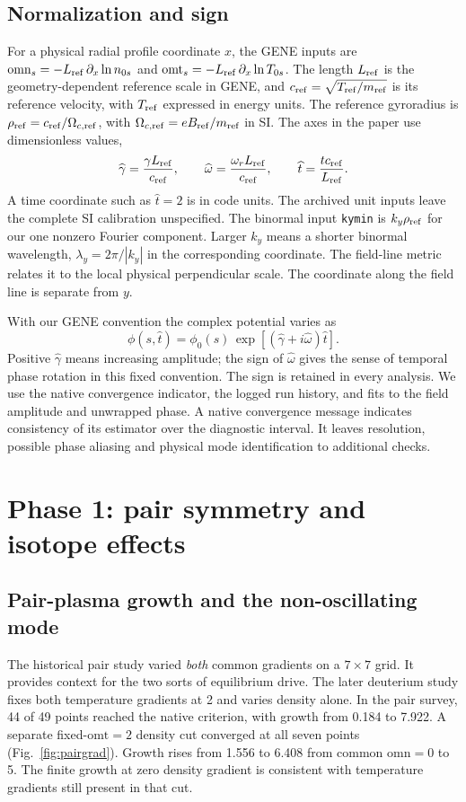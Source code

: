 \documentclass[11pt,letterpaper]{article}
\newcommand{\omn}{\mathrm{omn}}
\newcommand{\omt}{\mathrm{omt}}
\newcommand{\kn}{k_y\rho_{\rm ref}}
\newcommand{\gr}{\widehat\gamma}
\newcommand{\fr}{\widehat\omega}
\newcommand{\ttime}{\widehat t}
\begin{document}
\subsection{Normalization and sign}
For a physical radial profile coordinate $x$, the GENE inputs are $\omn_s=-L_{\rm ref}\,\partial_x\ln n_{0s}$ and $\omt_s=-L_{\rm ref}\,\partial_x\ln T_{0s}$. The length $L_{\rm ref}$ is the geometry-dependent reference scale in GENE, and $c_{\rm ref}=\sqrt{T_{\rm ref}/m_{\rm ref}}$ is its reference velocity, with $T_{\rm ref}$ expressed in energy units. The reference gyroradius is $\rho_{\rm ref}=c_{\rm ref}/\Omega_{c,{\rm ref}}$, with $\Omega_{c,{\rm ref}}=eB_{\rm ref}/m_{\rm ref}$ in SI. The axes in the paper use dimensionless values,
\begin{equation}
 \gr=\frac{\gamma L_{\rm ref}}{c_{\rm ref}},\qquad
 \fr=\frac{\omega_r L_{\rm ref}}{c_{\rm ref}},\qquad
 \ttime=\frac{t c_{\rm ref}}{L_{\rm ref}} .
\end{equation}
A time coordinate such as $\ttime=2$ is in code units. The archived unit inputs leave the complete SI calibration unspecified. The binormal input \texttt{kymin} is $\kn$ for our one nonzero Fourier component. Larger $k_y$ means a shorter binormal wavelength, $\lambda_y=2\pi/|k_y|$ in the corresponding coordinate. The field-line metric relates it to the local physical perpendicular scale. The coordinate along the field line is separate from $y$.

With our GENE convention the complex potential varies as
\begin{equation}
 \phi(s,\ttime)=\phi_0(s)\,\exp[(\gr+i\fr)\ttime].\label{eq:mode}
\end{equation}
Positive $\gr$ means increasing amplitude; the sign of $\fr$ gives the sense of temporal phase rotation in this fixed convention. The sign is retained in every analysis. We use the native convergence indicator, the logged run history, and fits to the field amplitude and unwrapped phase. A native convergence message indicates consistency of its estimator over the diagnostic interval. It leaves resolution, possible phase aliasing and physical mode identification to additional checks.

\section{Phase 1: pair symmetry and isotope effects}
\subsection{Pair-plasma growth and the non-oscillating mode}
The historical pair study varied \emph{both} common gradients on a $7\times7$ grid. It provides context for the two sorts of equilibrium drive. The later deuterium study fixes both temperature gradients at 2 and varies density alone. In the pair survey, 44 of 49 points reached the native criterion, with growth from 0.184 to 7.922. A separate fixed-$\omt=2$ density cut converged at all seven points (Fig.~\ref{fig:pairgrad}). Growth rises from 1.556 to 6.408 from common $\omn=0$ to 5. The finite growth at zero density gradient is consistent with temperature gradients still present in that cut.
\end{document}
